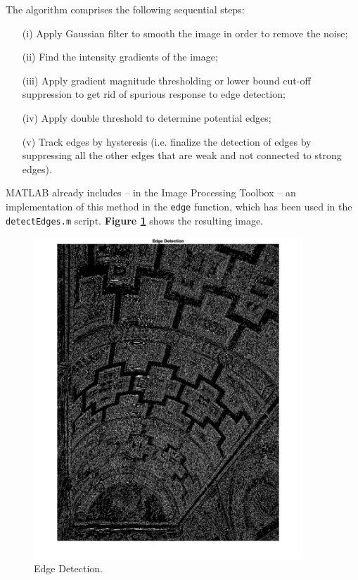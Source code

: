 \documentclass[12pt,a4paper]{article}
\begin{document}
The algorithm comprises the following sequential steps:
\begin{itemize}
    \item[(i)] Apply Gaussian filter to smooth the image in order to remove the noise;
    \item[(ii)] Find the intensity gradients of the image;
    \item[(iii)] Apply gradient magnitude thresholding or lower bound cut-off suppression to get rid of spurious response to edge detection;
    \item[(iv)] Apply double threshold to determine potential edges;
    \item[(v)] Track edges by hysteresis (i.e. finalize the detection of edges by suppressing all the other edges that are weak and not connected to strong edges).
\end{itemize}
\bigskip
MATLAB already includes -- in the Image Processing Toolbox -- an implementation of this method in the \verb|edge| function, which has been used in the \verb|detectEdges.m| script. \textbf{Figure \ref{fig:edges}} shows the resulting image.

\begin{figure}[H]
    \centering
    \includegraphics[width=0.9\textwidth]{Images/PalazzoTe_edges.png}
    \caption[Edge Detection.]{Edge Detection.}
    \label{fig:edges}
\end{figure}
\end{document}
